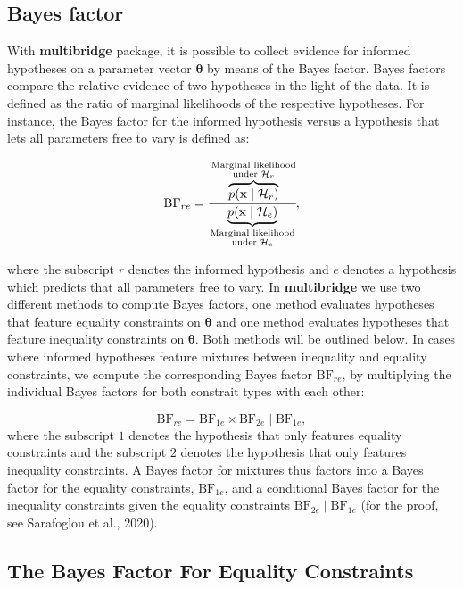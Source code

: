 \documentclass[
  english,
  man,floatsintext]{apa6}
\begin{document}
\hypertarget{bayes-factor}{%
\subsection{Bayes factor}\label{bayes-factor}}

With \textbf{multibridge} package, it is possible to collect evidence for informed hypotheses on a parameter vector \(\boldsymbol{\theta}\) by means of the Bayes factor. Bayes factors compare the relative evidence of two hypotheses in the light of the data. It is defined as the ratio of marginal likelihoods of the respective hypotheses. For instance, the Bayes factor for the informed hypothesis versus a hypothesis that lets all parameters free to vary is defined as:

\begin{align*}
\text{BF}_{re} = \cfrac{\overbrace{p(\mathbf{x}\mid \mathcal{H}_r)}^{\substack{\text{Marginal likelihood}\\\text{under $\mathcal{H}_r$}}}}{\underbrace{p(\mathbf{x}\mid \mathcal{H}_e)}_{\substack{\text{Marginal likelihood}\\\text{under $\mathcal{H}_e$}}}},
\end{align*}

where the subscript \(r\) denotes the informed hypothesis and \(e\) denotes a hypothesis which predicts that all parameters free to vary. In \textbf{multibridge} we use two different methods to compute Bayes factors, one method evaluates hypotheses that feature equality constraints on \(\boldsymbol{\theta}\) and one method evaluates hypotheses that feature inequality constraints on \(\boldsymbol{\theta}\). Both methods will be outlined below. In cases where informed hypotheses feature mixtures between inequality and equality constraints, we compute the corresponding Bayes factor \(\text{BF}_{re}\), by multiplying the individual Bayes factors for both constrait types with each other:

\[
\text{BF}_{re}
= \text{BF}_{1e} \times \text{BF}_{2e} \mid \text{BF}_{1e},
\]
where the subscript \(1\) denotes the hypothesis that only features equality constraints and the subscript \(2\) denotes the hypothesis that only features inequality constraints. A Bayes factor for mixtures thus factors into a Bayes factor for the equality constraints, \(\text{BF}_{1e}\), and a conditional Bayes factor for the inequality constraints given the equality constraints \(\text{BF}_{2e} \mid \text{BF}_{1e}\) (for the proof, see Sarafoglou et al., 2020).

\hypertarget{the-bayes-factor-for-equality-constraints}{%
\subsection{The Bayes Factor For Equality Constraints}\label{the-bayes-factor-for-equality-constraints}}
\end{document}
